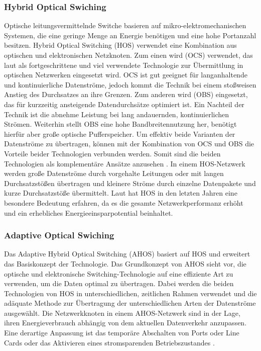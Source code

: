 \subsubsection{Hybrid Optical Swiching}
Optische leitungsvermittelnde Switche basieren auf mikro-elektromechanischen Systemen, die eine geringe Menge an Energie benötigen und eine hohe Portanzahl besitzen. Hybrid Optical Switching (HOS) verwendet eine Kombination aus optischen und elektronischen Netzknoten. Zum einen wird  (OCS) verwendet, das laut \textcite{tsinghua2011} als fortgeschrittene und viel verwendete Technologie zur Übermittlung in optischen Netzwerken eingesetzt wird. OCS ist gut geeignet für langanhaltende und kontinuierliche Datenströme, jedoch kommt die Technik bei einem stoßweisen Anstieg des Durchsatzes an ihre Grenzen. Zum anderen wird  (OBS) eingesetzt, das für kurzzeitig ansteigende Datendurchsätze optimiert ist. Ein Nachteil der Technik ist die abnehme Leistung bei lang andauernden, kontinuierlichen Strömen. Weiterhin stellt OBS eine hohe Bandbreitennutzung her, benötigt hierfür aber große optische Pufferspeicher. Um effektiv beide Varianten der Datenströme zu übertragen, können mit der Kombination von OCS und OBS die Vorteile beider Technologien verbunden werden. Somit sind die beiden Technologien als komplementäre Ansätze anzusehen \cite{tsinghua2011}. In einem HOS-Netzwerk werden große Datenströme durch vorgehalte Leitungen oder mit langen Durchsatzstößen übertragen und kleinere Ströme durch einzelne Datenpakete und kurze Durchsatzstöße übermittelt. Laut \textcite{adaptiveHOS} hat HOS in den letzten Jahren eine besondere Bedeutung erfahren, da es die gesamte Netzwerkperformanz erhöht und ein erhebliches Energieeinsparpotential beinhaltet.

\subsubsection{Adaptive Optical Swiching}
Das Adaptive Hybrid Optical Switching (AHOS) basiert auf HOS und erweitert das Basiskonzept der Technologie. Das Grundkonzept von AHOS sieht vor, die optische und elektronische Switching-Technologie auf eine effiziente Art zu verwenden, um die Daten optimal zu übertragen. Dabei werden die beiden Technologien von HOS in unterschiedlichen, zeitlichen Rahmen verwendet und die adäquate Methode zur Übertragung der unterschiedlichen Arten der Datenströme ausgewählt. Die Netzwerkknoten in einem AHOS-Netzwerk sind in der Lage, ihren Energieverbrauch abhängig von dem aktuellen Datenverkehr anzupassen. Eine derartige Anpassung ist das temporäre Abschalten von Ports oder Line Cards oder das Aktivieren eines stromsparenden Betriebszustandes \cite{adaptiveHOS}.
